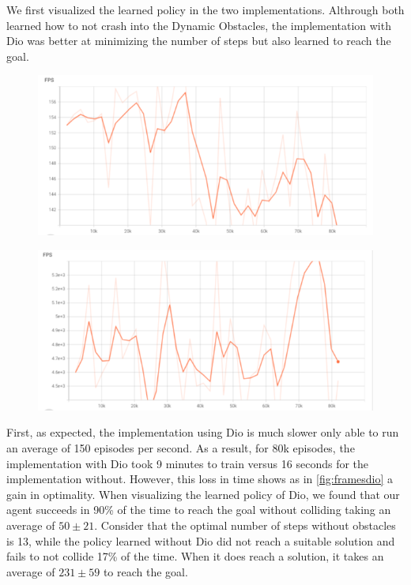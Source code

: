     We first visualized the learned policy in the two implementations. Althrough both learned 
    how to not crash into the Dynamic Obstacles, the implementation with Dio was better at minimizing the number of steps 
    but also learned to reach the goal. 


    \begin{figure}[H]
      \centering
      \begin{minipage}{.5\textwidth}
        \centering
        \includegraphics[width=1\linewidth]{figures/diofps.png}
        \label{fig:fpsdio}
      \end{minipage}%
      \begin{minipage}{.5\textwidth}
        \centering
        \includegraphics[width=1\linewidth]{figures/rlfps.png}
        \label{fig:fpsrl}
      \end{minipage}
    \end{figure}

    First, as expected, the implementation using Dio is much slower only able to run 
    an average of 150 episodes per second. As a result, for 80k episodes, the implementation with Dio 
    took 9 minutes to train versus 16 seconds for the implementation without. However, this loss in time shows as in \ref{fig:framesdio} 
    a gain in optimality. When visualizing the learned policy of Dio, we found that our agent succeeds in 90\% 
    of the time to reach the goal without colliding taking an average of $50 \pm 21$. Consider that 
    the optimal number of steps without obstacles is 13, while the policy learned without Dio did not reach a suitable solution and fails to 
    not collide 17\% of the time. When it does reach a solution, it takes an average of $231 \pm 59$ to reach the goal. 


